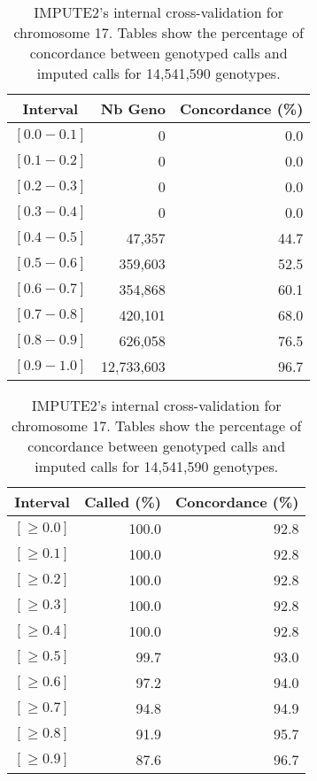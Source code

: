 \documentclass[10pt,twoside,english]{scrartcl}
\begin{document}
\begin{table}[H]
\protect\caption{IMPUTE2's internal cross-validation for chromosome 17. Tables show the
percentage of concordance between genotyped calls and imputed calls
for 14,541,590 genotypes.\label{tab:cross_validation_chr_17}}

\centering

\begin{tabular}{crr}
\hline 
\multicolumn{1}{c}{\textbf{Interval}}
 & \multicolumn{1}{c}{\textbf{Nb Geno}}
 & \multicolumn{1}{c}{\textbf{Concordance (\%)}}
\\
\hline 

$[0.0-0.1]$ & 0 & 0.0\\
$[0.1-0.2]$ & 0 & 0.0\\
$[0.2-0.3]$ & 0 & 0.0\\
$[0.3-0.4]$ & 0 & 0.0\\
$[0.4-0.5]$ & 47,357 & 44.7\\
$[0.5-0.6]$ & 359,603 & 52.5\\
$[0.6-0.7]$ & 354,868 & 60.1\\
$[0.7-0.8]$ & 420,101 & 68.0\\
$[0.8-0.9]$ & 626,058 & 76.5\\
$[0.9-1.0]$ & 12,733,603 & 96.7\\
\hline 
\end{tabular}
\hfill
\begin{tabular}{crr}
\hline 
\multicolumn{1}{c}{\textbf{Interval}}
 & \multicolumn{1}{c}{\textbf{Called (\%)}}
 & \multicolumn{1}{c}{\textbf{Concordance (\%)}}
\\
\hline 

$[\geq 0.0]$ & 100.0 & 92.8\\
$[\geq 0.1]$ & 100.0 & 92.8\\
$[\geq 0.2]$ & 100.0 & 92.8\\
$[\geq 0.3]$ & 100.0 & 92.8\\
$[\geq 0.4]$ & 100.0 & 92.8\\
$[\geq 0.5]$ & 99.7 & 93.0\\
$[\geq 0.6]$ & 97.2 & 94.0\\
$[\geq 0.7]$ & 94.8 & 94.9\\
$[\geq 0.8]$ & 91.9 & 95.7\\
$[\geq 0.9]$ & 87.6 & 96.7\\
\hline 
\end{tabular}


\end{table}
\end{document}
